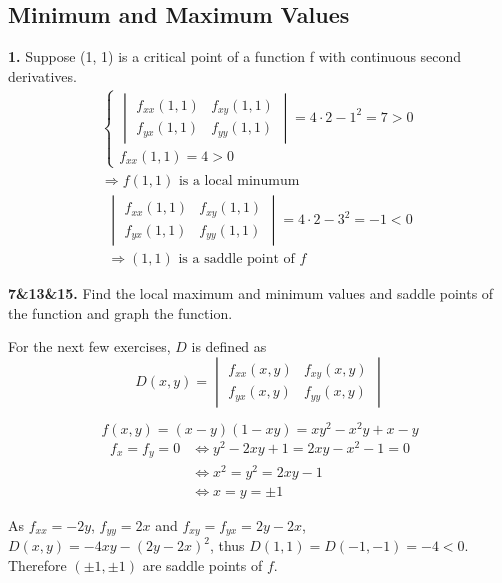\documentclass[a4paper,12pt]{article}
\newcommand{\exercise}[1]{\noindent\textbf{#1.}}
\begin{document}
\subsection{Minimum and Maximum Values}
\exercise{1} Suppose (1, 1) is a critical point of a function f with continuous
second derivatives.
\begin{multline}
  \begin{cases}
    \begin{vmatrix}
      f_{xx}(1, 1) & f_{xy}(1, 1)\\
      f_{yx}(1, 1) & f_{yy}(1, 1)
    \end{vmatrix} = 4 \cdot 2 - 1^2 = 7 > 0\\
    f_{xx}(1, 1) = 4 > 0
  \end{cases}\\
  \Longrightarrow f(1, 1)\text{ is a local minumum}\tag{a}
\end{multline}
\begin{multline}
  \begin{vmatrix}
    f_{xx}(1, 1) & f_{xy}(1, 1)\\
    f_{yx}(1, 1) & f_{yy}(1, 1)
  \end{vmatrix} = 4 \cdot 2 - 3^2 = -1 < 0\\
  \Longrightarrow (1, 1)\text{ is a saddle point of } f\tag{b}
\end{multline}

\exercise{7\&13\&15} Find the local maximum and minimum values and saddle points
of the function and graph the function.

For the next few exercises, $D$ is defined as
\[D(x, y) =
\begin{vmatrix}
  f_{xx}(x, y) & f_{xy}(x, y)\\
  f_{yx}(x, y) & f_{yy}(x, y)
\end{vmatrix}\]

\[f(x, y) = (x - y)(1 - xy) = xy^2 - x^2y + x - y\tag{7}\]
\begin{align*}
  f_x = f_y = 0
  &\iff y^2 - 2xy + 1 = 2xy - x^2 - 1 = 0\\
  &\iff x^2 = y^2 = 2xy - 1\\
  &\iff x = y = \pm 1
\end{align*}

As $f_{xx} = -2y$, $f_{yy} = 2x$ and $f_{xy} = f_{yx} = 2y - 2x$,
$D(x, y) = -4xy - (2y - 2x)^2$, thus $D(1, 1) = D(-1, -1) = -4 < 0$.
Therefore $(\pm 1, \pm 1)$ are saddle points of $f$.

\end{document}
